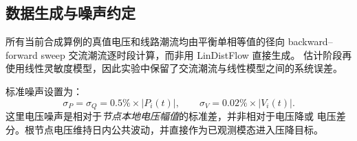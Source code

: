 \subsection{数据生成与噪声约定}

所有当前合成算例的真值电压和线路潮流均由平衡单相等值的径向
backward--forward sweep 交流潮流逐时段计算，而非用 LinDistFlow 直接生成。
估计阶段再使用线性灵敏度模型，因此实验中保留了交流潮流与线性模型之间的系统误差。

标准噪声设置为：
\[
\sigma_P=\sigma_Q=0.5\%\times |P_i(t)|,\qquad
\sigma_V=0.02\%\times |V_i(t)|.
\]
这里电压噪声是相对于\emph{节点本地电压幅值}的标准差，并非相对于电压降或
电压差分。根节点电压维持日内公共波动，并直接作为已观测模态进入压降目标。
